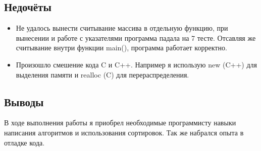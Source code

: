 \documentclass[12pt]{article}
\begin{document}
\subsection*{Недочёты}

\begin{itemize}
\item Не удалось вынести считывание массива в отдельную функцию, при вынесении и работе с указателями программа падала на 7 тесте. Отсавляя же считывание внутри функции main(), программа работает корректно.
\item Произошло смешение кода C и C++. Например я использую new (C++) для выделения памяти и realloc (C) для перераспределения.
\end{itemize}

\subsection*{Выводы}

В ходе выполнения работы я приобрел необходимые программисту навыки написания алгоритмов и использования сортировок. Так же набрался опыта в отладке кода.
\end{document}
